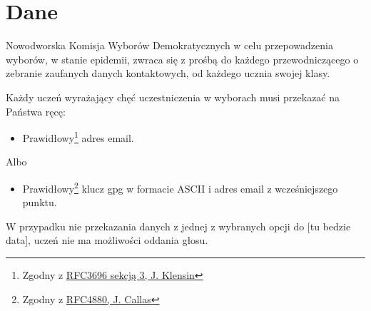 \section{Dane}


Nowodworska Komisja Wyborów Demokratycznych w celu przepowadzenia wyborów, w stanie epidemii, zwraca się z prośbą do każdego przewodniczącego o zebranie zaufanych danych kontaktowych, od każdego ucznia swojej klasy. \\

\par Każdy uczeń wyrażający chęć uczestniczenia w wyborach musi przekazać na Państwa ręcę:

\begin{itemize}
  \item Prawidłowy\footnote{Zgodny z \href{https://tools.ietf.org/html/rfc3696}{RFC3696 sekcją 3, J. Klensin}} adres email.
\end{itemize}

\vspace{-0.3cm}
\hspace{4cm} Albo
\vspace{-0.3cm}

\begin{itemize}
  \item Prawidłowy\footnote{Zgodny z \href{https://tools.ietf.org/html/rfc4880}{RFC4880, J. Callas}} klucz gpg w formacie ASCII i adres email z wcześniejszego punktu.
\end{itemize}
\vspace{0.3cm} %
W przypadku nie przekazania danych z jednej z wybranych opcji do [tu bedzie data], uczeń nie ma możliwości oddania głosu.
